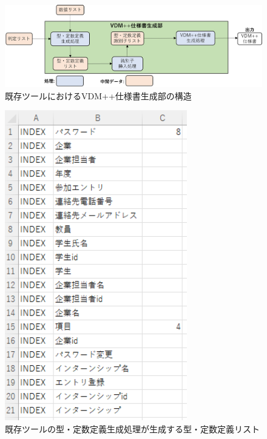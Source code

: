 \begin{figure}[tp]
    \begin{center}
        \includegraphics[width=1.0\columnwidth]{image/exis_generator_structure.png}
        \caption{既存ツールにおけるVDM++仕様書生成部の構造}
        \label{fig:exis_generator_structure}
    \end{center}
\end{figure}

\begin{figure}[tp]
    \begin{center}
        \includegraphics[width=300]{image/exis_katateisu_list.png}
        \caption{既存ツールの型・定数定義生成処理が生成する型・定数定義リスト}
        \label{fig:exis_katateisu_list}
    \end{center}
\end{figure}

